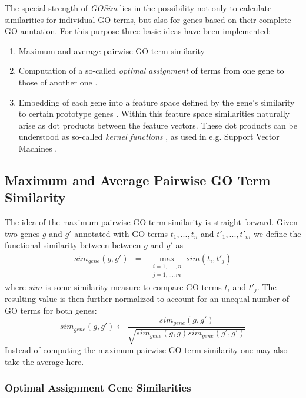 \documentclass[12pt,a4paper]{article}
\begin{document}
The special strength of \emph{GOSim} lies in the possibility not only to calculate similarities for individual GO terms, but also for genes based on their complete GO anntation. For this purpose three basic ideas have been implemented: 
\begin{enumerate}
\item Maximum and average pairwise GO term similarity
\item Computation of a so-called \emph{optimal assignment} of terms from one gene to those of another one \cite{FroeSpeerGOKer06}.
\item Embedding of each gene into a feature space defined by the gene's similarity to certain prototype genes  \cite{FroeGO05,FroeSpeerGOKer06}. Within this feature space similarities naturally arise as dot products between the feature vectors. These dot products can be understood as so-called \emph{kernel functions} \cite{SchSmo02}, as used in e.g. Support Vector Machines \cite{CorVap95}.
\end{enumerate}

\subsection{Maximum and Average Pairwise GO Term Similarity}

The idea of the maximum pairwise GO term similarity is straight forward. Given two genes $g$ and $g'$ annotated with GO terms $t_{1},...,t_{n}$ and $t'_{1},...,t'_{m}$ we define the functional similarity between between $g$ and $g'$ as
\begin{eqnarray}
sim_{gene}(g,g') & = & \max_{\begin{array}{c}
i=1,,...,n\\
j=1,...,m\end{array}}sim(t_{i},t'_{j})
\end{eqnarray}
where $sim$ is some similarity measure to compare GO terms $t_i$ and $t'_j$.
The resulting value is then further normalized to account for an unequal number of GO terms for both genes:
\begin{equation}
sim_{gene}(g,g')\leftarrow\frac{sim_{gene}(g,g')}{\sqrt{sim_{gene}(g,g)sim_{gene}(g',g')}}\label{eq:normalize}
\end{equation}
Instead of computing the maximum pairwise GO term similarity one may also take the average here.


\subsubsection{Optimal Assignment Gene Similarities}
\end{document}
